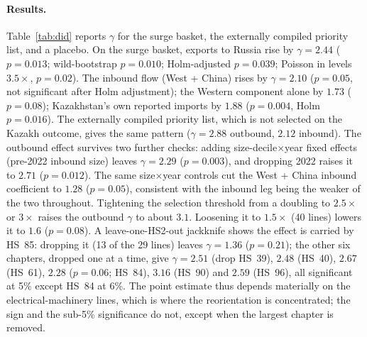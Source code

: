 \documentclass[12pt]{article}
\begin{document}
\paragraph{Results.} Table~\ref{tab:did} reports $\gamma$ for the surge basket, the
externally compiled priority list, and a placebo. On the surge basket, exports to Russia rise by
$\gamma = 2.44$ ($p = 0.013$; wild-bootstrap $p = 0.010$; Holm-adjusted $p = 0.039$; Poisson
in levels $3.5\times$, $p = 0.02$). The inbound flow (West + China) rises by
$\gamma = 2.10$ ($p = 0.05$, not significant after Holm adjustment); the Western component
alone by $1.73$ ($p = 0.08$); Kazakhstan's own reported imports by $1.88$ ($p = 0.004$, Holm
$p = 0.016$). The externally compiled priority list, which is not selected on the Kazakh outcome, gives the
same pattern ($\gamma = 2.88$ outbound, $2.12$ inbound). The outbound effect survives two
further checks: adding size-decile$\times$year fixed effects (pre-2022 inbound size) leaves
$\gamma = 2.29$ ($p = 0.003$), and dropping 2022 raises it to $2.71$ ($p = 0.012$). The same
size$\times$year controls cut the West + China inbound coefficient to $1.28$ ($p = 0.05$),
consistent with the inbound leg being the weaker of the two throughout. Tightening the
selection threshold from a doubling to $2.5\times$ or $3\times$ raises the outbound
$\gamma$ to about $3.1$. Loosening it to $1.5\times$ (40 lines) lowers it to $1.6$
($p = 0.08$). A leave-one-HS2-out jackknife shows the effect is carried by HS~85: dropping it
(13 of the 29 lines) leaves $\gamma = 1.36$ ($p = 0.21$); the other six chapters, dropped one
at a time, give $\gamma = 2.51$ (drop HS~39), $2.48$ (HS~40), $2.67$ (HS~61), $2.28$
($p = 0.06$; HS~84), $3.16$ (HS~90) and $2.59$ (HS~96), all significant at 5\% except HS~84 at
6\%. The point estimate thus depends materially on the electrical-machinery lines, which is
where the reorientation is concentrated; the sign and the sub-5\% significance do not, except
when the largest chapter is removed.
\end{document}
